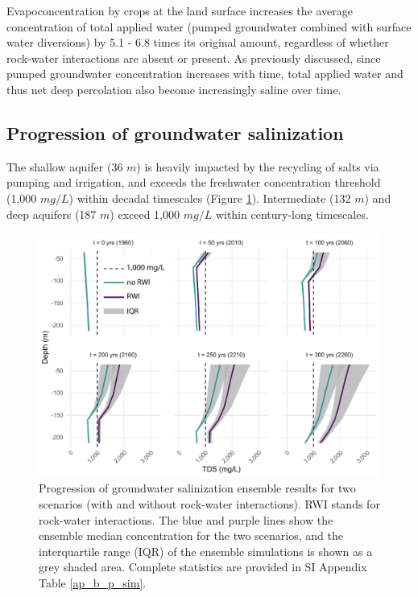 Evapoconcentration by crops at the land surface increases the average concentration of total applied water (pumped groundwater combined with surface water diversions) by 5.1 - 6.8
times its original amount, regardless of whether rock-water interactions are absent or present. As previously discussed, since pumped groundwater concentration increases with time, total applied water and thus net deep percolation also become increasingly saline over time.  




%
%
\subsection{Progression of groundwater salinization}
\label{ss_3_3}

The shallow aquifer (36 $m$) is heavily impacted by the recycling of salts via pumping and irrigation, and exceeds the freshwater concentration threshold (1,000 $mg/L$) within decadal timescales (Figure \ref{fig:p_sim}). Intermediate (132 $m$) and deep aquifers (187 $m$) exceed 1,000 $mg/L$ within century-long timescales. \\

\begin{figure}[H]
	\includegraphics[width=\textwidth]{ch3_figs/p_sim_both2.pdf}
	\caption{Progression of groundwater salinization ensemble results for two scenarios (with and without rock-water interactions). RWI stands for rock-water interactions. The blue and purple lines show the ensemble median concentration for the two scenarios, and the interquartile range (IQR) of the ensemble simulations is shown as a grey shaded area. Complete statistics are provided in SI Appendix Table \ref{ap_b_p_sim}.}
	\label{fig:p_sim}
\end{figure}


